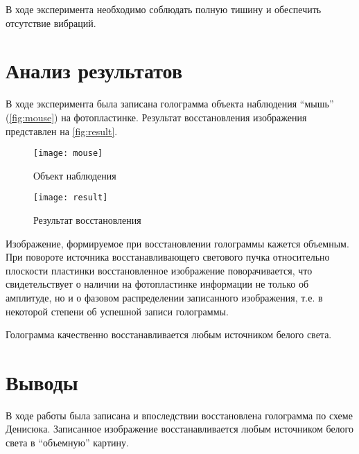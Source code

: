 В ходе эксперимента необходимо соблюдать полную тишину и обеспечить отсутствие вибраций.

\section{Анализ результатов}

В ходе эксперимента была записана голограмма объекта наблюдения \enquote{мышь} (\autoref{fig:mouse}) на фотопластинке. Результат восстановления изображения представлен на \autoref{fig:result}.

\begin{figure}[h]%
    \centering
    \texttt{[image: mouse]}%
    \caption[]{Объект наблюдения}%
    \label{fig:mouse}%
\end{figure}

\begin{figure}[h]%
    \centering
    \texttt{[image: result]}%
    \caption[]{Результат восстановления}%
    \label{fig:result}%
\end{figure}

Изображение, формируемое при восстановлении голограммы кажется объемным. При повороте источника восстанавливающего светового пучка относительно плоскости пластинки восстановленное изображение поворачивается, что свидетельствует о наличии на фотопластинке информации не только об амплитуде, но и о фазовом распределении записанного изображения, т.е. в некоторой степени об успешной записи голограммы.

Голограмма качественно восстанавливается любым источником белого света.

\section{Выводы}

  В ходе работы была записана и впоследствии восстановлена голограмма по схеме Денисюка. Записанное изображение восстанавливается любым источником белого света в \enquote{объемную} картину.